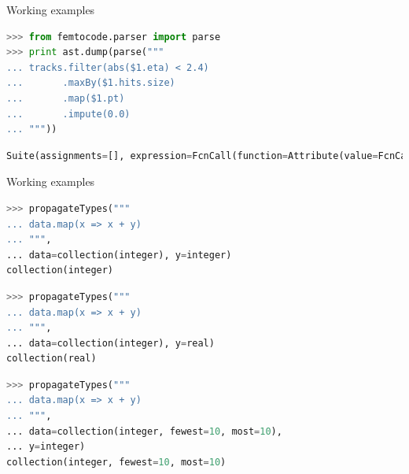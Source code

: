 \documentclass{beamer}
\begin{document}
\begin{frame}[fragile]{Working examples}
\vspace{0.3 cm}
\begin{lstlisting}[language=python]
>>> from femtocode.parser import parse
>>> print ast.dump(parse("""
... tracks.filter(abs($1.eta) < 2.4)
...       .maxBy($1.hits.size)
...       .map($1.pt)
...       .impute(0.0)
... """))
\end{lstlisting}
\begin{lstlisting}[language=python,basicstyle=\ttfamily\scriptsize]
Suite(assignments=[], expression=FcnCall(function=Attribute(value=FcnCall(function=Attribute(value=FcnCall(function=Attribute(value=FcnCall(function=Attribute(value=Name(id='tracks', ctx=Load()), attr='filter', ctx=Load()), positional=[Compare(left=FcnCall(function=Name(id='abs', ctx=Load()), positional=[Attribute(value=AtArg(num=1), attr='eta', ctx=Load())], names=[], named=[]), ops=[Lt()], comparators=[Num(n=2.4)])], names=[], named=[]), attr='maxBy', ctx=Load()), positional=[Attribute(value=Attribute(value=AtArg(num=1), attr='hits', ctx=Load()), attr='size', ctx=Load())], names=[], named=[]), attr='map', ctx=Load()), positional=[Attribute(value=AtArg(num=1), attr='pt', ctx=Load())], names=[], named=[]), attr='impute', ctx=Load()), positional=[Num(n=0.0)], names=[], named=[]))
\end{lstlisting}
\end{frame}

\begin{frame}[fragile]{Working examples}
\vspace{0.3 cm}
\begin{lstlisting}[language=python]
>>> propagateTypes("""
... data.map(x => x + y)
... """,
... data=collection(integer), y=integer)
collection(integer)
\end{lstlisting}

\begin{lstlisting}[language=python]
>>> propagateTypes("""
... data.map(x => x + y)
... """,
... data=collection(integer), y=real)
collection(real)
\end{lstlisting}

\begin{lstlisting}[language=python]
>>> propagateTypes("""
... data.map(x => x + y)
... """,
... data=collection(integer, fewest=10, most=10),
... y=integer)
collection(integer, fewest=10, most=10)
\end{lstlisting}
\end{frame}
\end{document}
